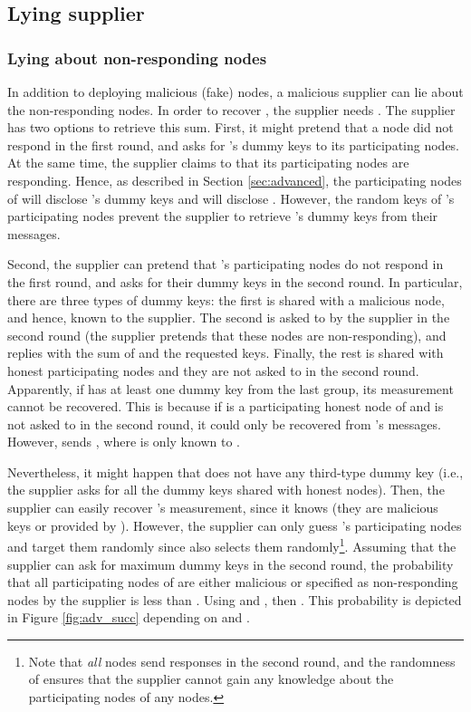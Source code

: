 \documentclass[11pt,a4paper]{article}
\theoremstyle{plain}
\theoremstyle{plain}
\theoremstyle{plain}
\theoremstyle{plain}
\theoremstyle{nonumberplain} \theoremseparator{}
\begin{document}
\subsection{Lying supplier}


\subsubsection*{Lying about non-responding nodes}

In addition to deploying malicious (fake) nodes, a malicious supplier can
lie about the non-responding nodes. 
In order to recover , the supplier needs . The supplier has two options to retrieve this sum.
First, it might pretend that a node  did not respond in the first round,
and asks for 's dummy keys to its participating nodes. At the same time, the supplier claims to  that
its participating nodes are responding. 
Hence, as described in Section \ref{sec:advanced}, the participating nodes of  will disclose 's
dummy keys and  will disclose . However, the random keys of 's participating nodes prevent the supplier to retrieve 's dummy keys from their messages. 

Second, the supplier can pretend that 's participating nodes do not respond in the first round,
and asks  for their dummy keys in the second round. 
In particular, there are three types of dummy keys: the first is shared with a malicious node, and hence, known to the supplier. The second is asked to  by the supplier in the second round (the supplier pretends that these nodes are non-responding), and  replies with the sum of  and the requested keys. Finally, the rest is shared with honest participating nodes and they are not asked to  in the second round. Apparently, if  has at least one dummy key from the last group, its measurement cannot be recovered. This is because if  is a participating honest node of  and  is not asked to  in the second round, it could only be recovered from 's messages. However,  sends , where  is only known to .    
 
Nevertheless, it might happen that  does not have any third-type dummy key (i.e., the supplier asks  for all the dummy keys shared with honest nodes). Then, the supplier can easily recover 's measurement, since it knows  (they are malicious keys or provided by ). However, the supplier can only guess 's participating nodes and target them randomly since  also selects them randomly\footnote{Note that \emph{all} nodes send responses in the second round, and the randomness of  ensures that the supplier cannot gain any knowledge about the participating nodes of any nodes.}. 
Assuming that the supplier can ask  for maximum  dummy keys in the second round, the probability that all participating nodes of  are either malicious or specified as non-responding nodes by the supplier is less than . Using  and , then .  
This probability is depicted in Figure \ref{fig:adv_succ} depending on  and .
\end{document}
